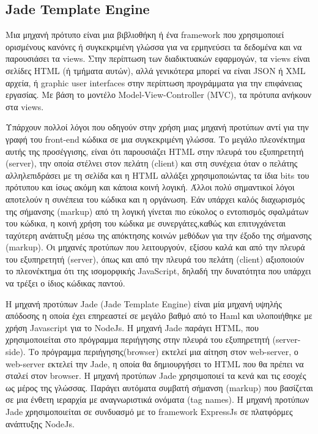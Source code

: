 		
	\subsection{Jade Template Engine}
	

	Μια μηχανή πρότυπο είναι μια βιβλιοθήκη ή ένα framework που χρησιμοποιεί ορισμένους κανόνες ή συγκεκριμένη γλώσσα για να ερμηνεύσει τα δεδομένα και να παρουσιάσει τα views. Στην περίπτωση των διαδικτυακών εφαρμογών, τα  views είναι σελίδες HTML (ή τμήματα αυτών), αλλά γενικότερα μπορεί να είναι JSON ή XML αρχεία, ή graphic user interfaces στην περίπτωση προγράμματα  για την επιφάνειας εργασίας. Με βάση το μοντέλο Model-View-Controller (MVC), τα πρότυπα ανήκουν στα views.

		Υπάρχουν πολλοί λόγοι που οδηγούν στην χρήση μιας μηχανή προτύπων αντί για την γραφή του front-end κώδικα σε μια συγκεκριμένη γλώσσα. Το μεγάλο πλεονέκτημα αυτής της προσέγγισης, είναι ότι παρουσιάζει HTML στην πλευρά του εξυπηρετητή (server), την οποία στέλνει στον πελάτη (client) και στη συνέχεια όταν ο πελάτης αλληλεπιδράσει με τη σελίδα και η HTML αλλάξει χρησιμοποιώντας τα ίδια bits του πρότυπου και ίσως ακόμη και κάποια κοινή λογική. Άλλοι πολύ σημαντικοί λόγοι αποτελούν η συνέπεια του κώδικα και η οργάνωση.  Εάν υπάρχει καλός διαχωρισμός της σήμανσης (markup) από τη λογική γίνεται πιο εύκολος ο εντοπισμός σφαλμάτων του κώδικα, η κοινή χρήση του κώδικα με συνεργάτες,καθώς και επιτυγχάνεται ταχύτερη ανάπτυξη μέσω της απόκτησης κοινών μεθόδων για την έξοδο της σήμανσης (markup). Οι μηχανές προτύπων που λειτουργούν, εξίσου καλά και από την πλευρά του εξυπηρετητή (server), όπως και από την πλευρά του πελάτη (client) αξιοποιούν το πλεονέκτημα ότι της ισομορφικής JavaScript, δηλαδή την δυνατότητα που υπάρχει να τρέξει ο ίδιος κώδικας παντού.
	\cite{jade}

		Η μηχανή προτύπων Jade (Jade Template Engine)  είναι μία μηχανή υψηλής απόδοσης η οποία έχει επηρεαστεί σε μεγάλο βαθμό από το Haml και υλοποιήθηκε με χρήση Javascript για το NodeJs. Η μηχανή Jade παράγει HTML, που χρησιμοποιείται στο πρόγραμμα περιήγησης στην πλευρά του εξυπηρετητή (server-side). Το πρόγραμμα περιήγησης(browser) εκτελεί μια αίτηση στον web-server, ο web-server εκτελεί την Jade, η οποία θα δημιουργήσει το HTML που θα πρέπει να σταλεί στον browser. Η μηχανή προτύπων Jade χρησιμοποιεί τα κενά και τις εσοχές ως μέρος της γλώσσας. Παράγει αυτόματα συμβατή σήμανση (markup) που βασίζεται σε μια ένθετη ιεραρχία με αναγνωριστικά ονόματα (tag names). Η μηχανή προτύπων Jade χρησιμοποιείται σε συνδυασμό με το framework ExpressJs σε πλατφόρμες ανάπτυξης NodeJs.

